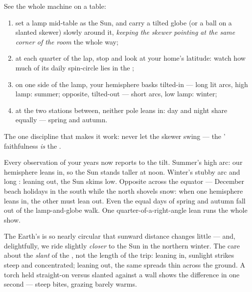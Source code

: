 \begin{method}\label{met:g6:sun-earth-moon:globe}
See the whole machine on a table:
\begin{enumerate}
  \item set a lamp mid-table as the Sun, and carry a tilted globe
        (or a ball on a slanted skewer) slowly around it,
        \emph{keeping the skewer pointing at the same corner of
        the room} the whole way;
  \item at each quarter of the lap, stop and look at your home's
        latitude: watch how much of its daily spin-circle lies in
        the ;
  \item on one side of the lamp, your hemisphere basks tilted-in
        --- long lit arcs, high lamp: summer; opposite, tilted-out
        --- short arcs, low lamp: winter;
  \item at the two stations between, neither pole leans in: day
        and night share equally --- spring and autumn.
\end{enumerate}
The one discipline that makes it work: never let the skewer swing
--- the ' faithfulness \emph{is} the .
\end{method}

\begin{example}\label{ex:g6:sun-earth-moon:clues}
Every observation of your  years now reports to the tilt.
Summer's high arc: our hemisphere leans in, so the Sun stands
taller at noon. Winter's stubby arc and long : leaning out,
the Sun skims low. Opposite  across the equator ---
December beach holidays in the south while the north shovels snow:
when one hemisphere leans in, the other must lean out. Even the
equal days of spring and autumn fall out of the lamp-and-globe
walk. One quarter-of-a-right-angle lean runs the whole show.
\end{example}

\begin{remark}\label{rem:g6:sun-earth-moon:notdistance}
The Earth's  is so nearly circular that sunward distance
changes little --- and, delightfully, we ride slightly
\emph{closer} to the Sun in the northern winter. The  care
about the \emph{slant} of the , not the length of the trip:
leaning in, sunlight strikes steep and concentrated; leaning out,
the same  spreads thin across the ground. A torch held
straight-on versus slanted against a wall shows the difference in
one second --- steep  bites, grazing  barely warms.
\end{remark}

